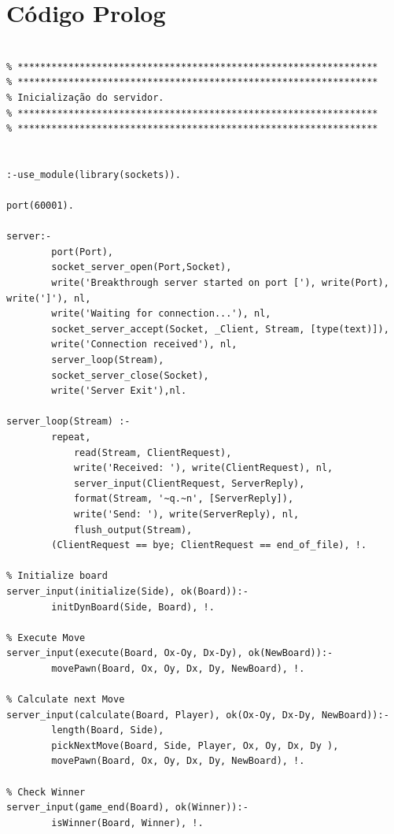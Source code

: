 \documentclass[15pt,a4paper]{article}
\begin{document}
\nocite{breakSite}
\nocite{refman}
\nocite{sicstus}
\nocite{tut1}
\nocite{tut2}
\nocite{listings}


\newpage

\appendix
\section{Código Prolog}


\begin{lstlisting}

% ****************************************************************
% ****************************************************************
% Inicialização do servidor.
% ****************************************************************
% ****************************************************************


:-use_module(library(sockets)).

port(60001).

server:-
		port(Port),
		socket_server_open(Port,Socket),
		write('Breakthrough server started on port ['), write(Port), write(']'), nl,
		write('Waiting for connection...'), nl,
		socket_server_accept(Socket, _Client, Stream, [type(text)]),
		write('Connection received'), nl,
		server_loop(Stream),
		socket_server_close(Socket),
		write('Server Exit'),nl.

server_loop(Stream) :-
		repeat,
			read(Stream, ClientRequest),
			write('Received: '), write(ClientRequest), nl, 
			server_input(ClientRequest, ServerReply),
			format(Stream, '~q.~n', [ServerReply]),
			write('Send: '), write(ServerReply), nl, 
			flush_output(Stream),
		(ClientRequest == bye; ClientRequest == end_of_file), !.

% Initialize board
server_input(initialize(Side), ok(Board)):- 
		initDynBoard(Side, Board), !.

% Execute Move	
server_input(execute(Board, Ox-Oy, Dx-Dy), ok(NewBoard)):- 
		movePawn(Board, Ox, Oy, Dx, Dy, NewBoard), !.

% Calculate next Move
server_input(calculate(Board, Player), ok(Ox-Oy, Dx-Dy, NewBoard)):- 
		length(Board, Side),
		pickNextMove(Board, Side, Player, Ox, Oy, Dx, Dy ),
		movePawn(Board, Ox, Oy, Dx, Dy, NewBoard), !.
	
% Check Winner
server_input(game_end(Board), ok(Winner)):- 
		isWinner(Board, Winner), !.
	

\end{lstlisting}
\end{document}
